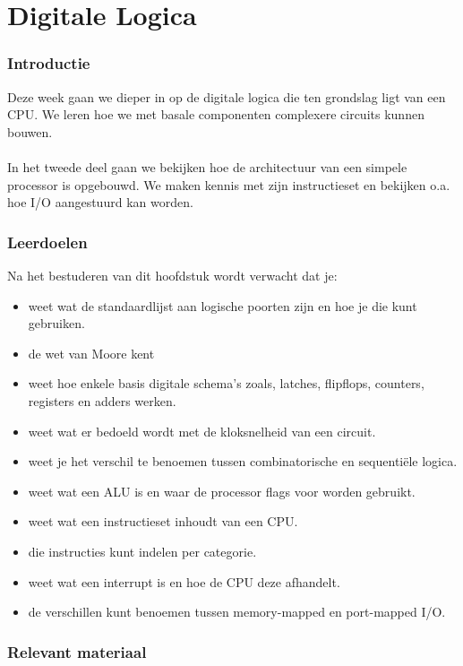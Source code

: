 \chapter{Digitale Logica}
\label{chap:digitalelogica}

\subsection*{Introductie}
Deze week gaan we dieper in op de digitale logica die ten grondslag ligt van een CPU. We leren hoe we met basale componenten complexere circuits kunnen bouwen.  \\ \\
In het tweede deel gaan we bekijken hoe de architectuur van een simpele processor is opgebouwd. We maken kennis met zijn instructieset en bekijken o.a. hoe I/O aangestuurd kan worden.

\subsection*{Leerdoelen}
Na het bestuderen van dit hoofdstuk wordt verwacht dat je:
\begin{itemize}
    \item[--] weet wat de standaardlijst aan logische poorten zijn en hoe je die kunt gebruiken.
    \item[--] de wet van Moore kent
    \item[--] weet hoe enkele basis digitale schema's zoals, latches, flipflops, counters, registers en adders werken.
    \item[--] weet wat er bedoeld wordt met de kloksnelheid van een circuit.
    \item[--] weet je het verschil te benoemen tussen combinatorische en sequentiële logica.
    \item[--] weet wat een ALU is en waar de processor flags voor worden gebruikt.
    \item[--] weet wat een instructieset inhoudt van een CPU.
    \item[--] die instructies kunt indelen per categorie.
    \item[--] weet wat een interrupt is en hoe de CPU deze afhandelt.  
    \item[--] de verschillen kunt benoemen tussen memory-mapped en port-mapped I/O.
\end{itemize}

\subsection*{Relevant materiaal}

